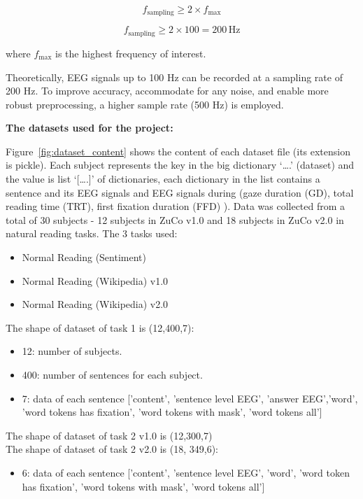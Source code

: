 \documentclass[journal]{IEEEtran}
\begin{document}
\begin{equation}
	f_{\text{sampling}} \geq 2 \times f_{\text{max}}
\end{equation}

\begin{equation}
	f_{\text{sampling}} \geq 2 \times 100 = 200 \, \text{Hz}
\end{equation}

\noindent where \( f_{\text{max}} \) is the highest frequency of interest.


Theoretically, EEG signals up to 100 Hz can be recorded at a sampling rate of 200 Hz. To improve accuracy, accommodate for any noise, and enable more robust preprocessing, a higher sample rate (500 Hz) is employed.

\textbf{The datasets used for the project:}

Figure~\ref{fig:dataset_content} shows the content of each dataset file (its extension is pickle). Each subject represents the key in the big dictionary ‘{….}’ (dataset) and the value is list ‘[….]’ of dictionaries, each dictionary in the list contains a sentence and its EEG signals and EEG signals during (gaze duration (GD), total reading time (TRT), first fixation duration (FFD) ). Data was collected from a total of 30 subjects - 12 subjects in ZuCo v1.0 and 18 subjects in ZuCo v2.0 in natural reading tasks. The 3 tasks used: 

\begin{itemize}
	\item Normal Reading (Sentiment)
	\item Normal Reading (Wikipedia) v1.0
	\item Normal Reading (Wikipedia) v2.0
\end{itemize}

The shape of dataset of task 1 is (12,400,7):
\begin{itemize}
	\item 12: number of subjects.
	\item 400: number of sentences for each subject.
	\item 7: data of each sentence ['content', 'sentence level EEG', 'answer EEG','word', 'word tokens has fixation', 'word tokens with mask', 'word tokens all']
\end{itemize}
The shape of dataset of task 2 v1.0 is (12,300,7) \\
The shape of dataset of task 2 v2.0 is (18, 349,6):
\begin{itemize}
	\item 6: data of each sentence ['content', 'sentence level EEG', 'word', 'word token has fixation', 'word tokens with mask', 'word tokens all']
\end{itemize}
\end{document}
